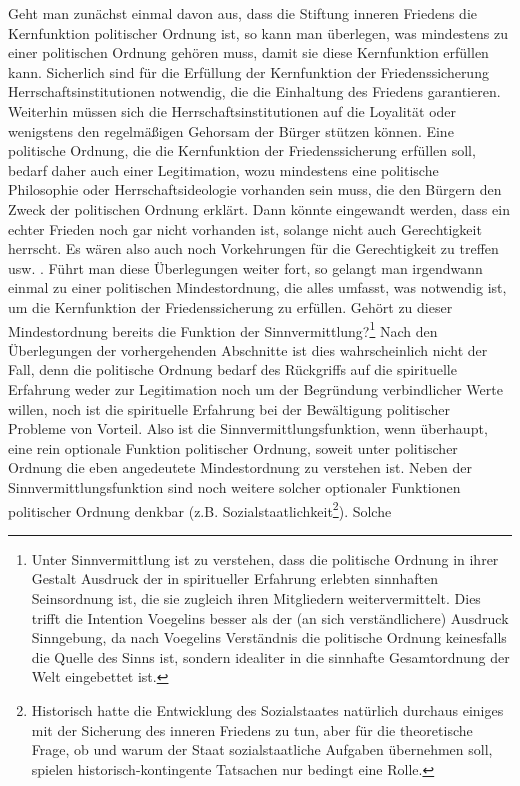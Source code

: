 Geht man zunächst einmal davon aus, dass die Stiftung inneren Friedens die
Kernfunktion politischer Ordnung ist, so kann man überlegen, was mindestens zu
einer politischen Ordnung gehören muss, damit sie diese Kernfunktion erfüllen
kann. Sicherlich sind für die Erfüllung der Kernfunktion der Friedenssicherung
Herrschaftsinstitutionen notwendig, die die Einhaltung des Friedens
garantieren. Weiterhin müssen sich die Herrschaftsinstitutionen auf die
Loyalität oder wenigstens den regelmäßigen Gehorsam der Bürger stützen können.
Eine politische Ordnung, die die Kernfunktion der Friedenssicherung erfüllen
soll, bedarf daher auch einer Legitimation, wozu mindestens eine politische
Philosophie oder Herrschaftsideologie vorhanden sein muss, die den Bürgern den
Zweck der politischen Ordnung erklärt. Dann könnte eingewandt werden, dass ein
echter Frieden noch gar nicht vorhanden ist, solange nicht auch Gerechtigkeit
herrscht. Es wären also auch noch Vorkehrungen für die Gerechtigkeit zu
treffen usw. . Führt man diese Überlegungen weiter fort, so gelangt man
irgendwann einmal zu einer politischen Mindestordnung, die alles umfasst, was
notwendig ist, um die Kernfunktion der Friedenssicherung zu erfüllen. Gehört
zu dieser Mindestordnung bereits die Funktion der
Sinnvermittlung?\footnote{Unter Sinnvermittlung ist zu verstehen, dass die
  politische Ordnung in ihrer Gestalt Ausdruck der in spiritueller Erfahrung
  erlebten sinnhaften Seinsordnung ist, die sie zugleich ihren Mitgliedern
  weitervermittelt. Dies trifft die Intention Voegelins besser als der (an
  sich verständlichere) Ausdruck Sinngebung, da nach Voegelins Verständnis die
  politische Ordnung keinesfalls die Quelle des Sinns ist, sondern idealiter
  in die sinnhafte Gesamtordnung der Welt eingebettet ist.} Nach den
Überlegungen der vorhergehenden Abschnitte ist dies wahrscheinlich nicht der
Fall, denn die politische Ordnung bedarf des Rückgriffs auf die spirituelle
Erfahrung weder zur Legitimation noch um der Begründung verbindlicher Werte
willen, noch ist die spirituelle Erfahrung bei der Bewältigung politischer
Probleme von Vorteil. Also ist die Sinnvermittlungsfunktion, wenn überhaupt,
eine rein optionale Funktion politischer Ordnung, soweit unter politischer
Ordnung die eben angedeutete Mindestordnung zu verstehen ist. Neben der
Sinnvermittlungsfunktion sind noch weitere solcher optionaler Funktionen
politischer Ordnung denkbar (z.B. Sozialstaatlichkeit\footnote{Historisch
  hatte die Entwicklung des Sozialstaates natürlich durchaus einiges mit der
  Sicherung des inneren Friedens zu tun, aber für die theoretische Frage, ob
  und warum der Staat sozialstaatliche Aufgaben übernehmen soll, spielen
  historisch-kontingente Tatsachen nur bedingt eine Rolle.}). Solche
